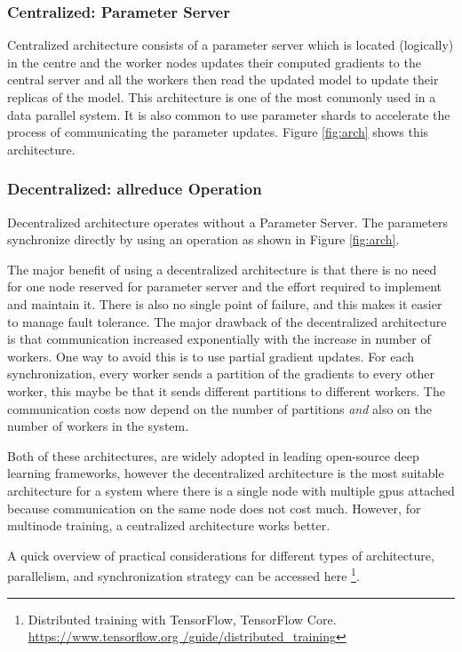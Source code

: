 \subsubsection{Centralized: Parameter Server}
Centralized architecture consists of a parameter server which is located (logically) in the centre and the worker nodes updates their computed gradients to the central server and all the workers then read the updated model to update their replicas of the model. This architecture is one of the most commonly used in a data parallel system. It is also common to use parameter shards to accelerate the process of communicating the parameter updates. Figure \ref{fig:arch} shows this architecture.

\subsubsection{Decentralized: allreduce Operation}
Decentralized architecture operates without a Parameter Server. The parameters synchronize directly by using an  operation as shown in Figure \ref{fig:arch}. 

The major benefit of using a decentralized architecture is that there is no need for one node reserved for parameter server and the effort required to implement and maintain it. There is also no single point of failure, and this makes it easier to manage fault tolerance. The major drawback of the decentralized architecture is that communication increased exponentially with the increase in number of workers. One way to avoid this is to use partial gradient updates. For each synchronization, every worker sends a partition of the gradients to every other worker, this maybe be that it sends different partitions to different workers.  The communication costs now depend on the number of partitions \emph{and} also on the number of workers in the system. 

Both of these architectures, are widely adopted in leading open-source deep learning frameworks, however the decentralized architecture is the most suitable architecture for a system where there is a single node with multiple \acrshort{gpu}s attached because communication on the same node does not cost much. However, for multinode training, a centralized architecture works better. 

A quick overview of practical considerations for different types of architecture, parallelism, and synchronization strategy can be accessed here \footnote{Distributed training with TensorFlow, TensorFlow Core. \href{https://www.tensorflow.org/guide/distributed\_training}{https://www.tensorflow.org /guide/distributed\_training} }. 


